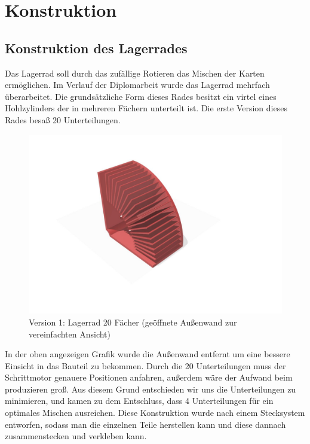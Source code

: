 \pagebreak
\section{Konstruktion}
\subsection{Konstruktion des Lagerrades}
Das Lagerrad soll durch das zufällige Rotieren das Mischen der Karten ermöglichen. Im Verlauf der Diplomarbeit wurde das Lagerrad mehrfach überarbeitet.
Die grundsätzliche Form dieses Rades besitzt ein virtel eines Hohlzylinders der in mehreren Fächern unterteilt ist. Die erste Version dieses Rades besaß 20 Unterteilungen.

\begin{figure}[H]
    \centering
    \includegraphics[scale=0.5,page=1]{fig/mech/LagerRad20F}
    \caption{Version 1: Lagerrad 20 Fächer (geöffnete Außenwand zur vereinfachten Ansicht)}
\end{figure}

In der oben angezeigen Grafik wurde die Außenwand entfernt um eine bessere Einsicht in das Bauteil zu bekommen.
Durch die 20 Unterteilungen muss der Schrittmotor genauere Positionen anfahren, außerdem wäre der Aufwand beim produzieren groß. Aus diesem Grund
entschieden wir uns die Unterteilungen zu minimieren, und kamen zu dem Entschluss, dass 4 Unterteilungen für ein optimales Mischen ausreichen. Diese Konstruktion
wurde nach einem Stecksystem entworfen, sodass man die einzelnen Teile herstellen kann und diese dannach zusammenstecken und verkleben kann.

